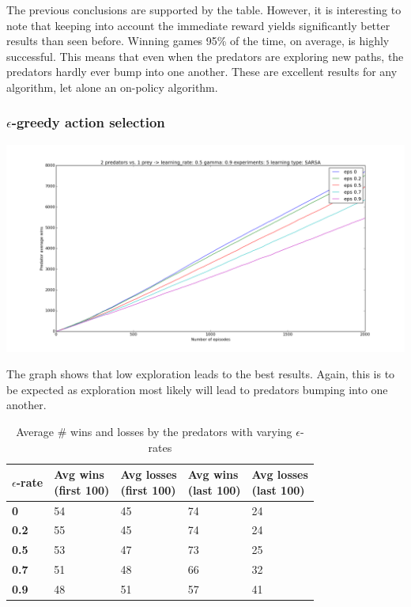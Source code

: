 The previous conclusions are supported by the table. However, it is interesting to note that keeping into account the immediate reward yields significantly better results than seen before. Winning games 95\% of the time, on average, is highly successful. This means that even when the predators are exploring new paths, the predators hardly ever bump into one another. These are excellent results for any algorithm, let alone an on-policy algorithm.

\subsubsection{$\epsilon$-greedy action selection}
\begin{center}
	\includegraphics[scale=0.3]{2_predators_epsilon_SARSA}
\end{center}

The graph shows that low exploration leads to the best results. Again, this is to be expected as exploration most likely will lead to predators bumping into one another.

\begin{table}[H]
\begin{center}
\begin{tabular}{| l | l | l | l | l |}
\hline
\parbox{2cm}{\textbf{$\epsilon$-rate}} & \parbox{2cm}{\textbf{Avg wins \\ (first 100)}} & \parbox{2cm}{\textbf{Avg losses \\ (first 100)}} & \parbox{2cm}{\textbf{Avg wins \\ (last 100)}} & \parbox{2cm}{\textbf{Avg losses \\ (last 100)}} \\
\hline
\textbf{0} & 54 & 45 & 74 & 24 \\
\hline
\textbf{0.2} & 55 & 45 & 74 & 24 \\
\hline
\textbf{0.5} & 53 & 47 & 73 & 25 \\
\hline
\textbf{0.7} & 51 & 48 & 66 & 32 \\
\hline
\textbf{0.9} & 48 & 51 & 57 & 41 \\
\hline
\end{tabular}
\caption{Average \# wins and losses by the predators with varying $\epsilon$-rates}
\end{center}
\end{table}

